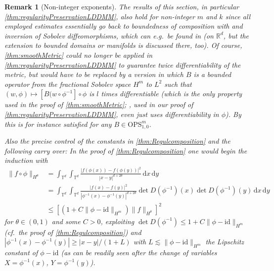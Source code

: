 \documentclass[a4paper, 12pt]{article}
\newtheorem{remark}[theorem]{Remark}
\newcommand{\R}{\mathbb{R}}
\newcommand{\T}{\mathbb{T}}
\renewcommand{\d}{\mathrm{d}}
\newcommand{\id}{\mathrm{id}}
\renewcommand{\L}{\mathcal{L}}
\begin{document}
\begin{remark}[Non-integer exponents]
The results of this section, in particular \cref{thm:regularityPreservationLDDMM}, also hold for non-integer $m$ and $k$ since all employed estimates essentially go back to boundedness of composition with and inversion of Sobolev diffeomorphisms,
which can e.g.\ be found in \cite[Lemma\,B.5-B.6]{InKaTo13} (on $\R^d$, but the extension to bounded domains or manifolds is discussed there, too).
Of course, \cref{thm:smoothMetric} could no longer be applied in \cref{thm:regularityPreservationLDDMM} to guarantee twice differentiability of the metric,
but would have to be replaced by a version in which $B$ is a bounded operator from the \emph{fractional} Sobolev space $H^m$ to $L^2$
such that $(w,\phi)\mapsto[B(w\circ\phi^{-1}]\circ\phi$ is $l$ times differentiable
(which is the only property used in the proof of \cref{thm:smoothMetric}; \cite[Thm.\,1]{GuRaRuWi23}, used in our proof of \cref{thm:regularityPreservationLDDMM}, even just uses differentiability in $\phi$).
By \cite[Thm.\,4.16 \& Thm.\,5.1]{BaBrCiEsKo20} this is for instance satisfied for any $B\in\mathrm{OPS}_{1,0}^{m}$.

Also the precise control of the constants in \cref{thm:Regulcomposition} and the following carry over:
In the proof of \cref{thm:Regulcomposition} one would begin the induction with
\begin{align*}
\|f\circ\phi\|_{H^\theta}
&=\int_{\T^d}\int_{\T^d}\frac{|f(\phi(x))-f(\phi(y))|^2}{|x-y|^{d+2\theta}}\,\d x\,\d y\\
&=\int_{\T^d}\int_{\T^d}\frac{|f(x)-f(y)|^2}{|\phi^{-1}(x)-\phi^{-1}(y)|^{d+2\theta}}\det D(\phi^{-1})(x)\det D(\phi^{-1})(y)\,\d x\,\d y\\
&\leq[(1+C\|\phi-\id\|_{H^m})\|f\|_{H^\theta}]^2
\end{align*}
for $\theta\in(0,1)$ and some $C>0$, exploiting $\det D(\phi^{-1})\leq1+C\|\phi-\id\|_{H^m}$ (cf.\ the proof of \cref{thm:Regulcomposition}) and $|\phi^{-1}(x)-\phi^{-1}(y)|\geq|x-y|/(1+L)$
with $L\lesssim\|\phi-\id\|_{H^m}$ the Lipschitz constant of $\phi-\id$ (as can be readily seen after the change of variables $X=\phi^{-1}(x)$, $Y=\phi^{-1}(y)$).
\end{remark}
\end{document}
